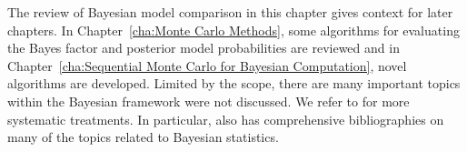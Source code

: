 The review of Bayesian model comparison in this chapter gives context for
later chapters. In Chapter~\ref{cha:Monte Carlo Methods}, some algorithms for
evaluating the Bayes factor and posterior model probabilities are reviewed
and in Chapter~\ref{cha:Sequential Monte Carlo for Bayesian Computation},
novel algorithms are developed. Limited by the scope, there are many
important topics within the Bayesian framework were not discussed. We refer
to \cite{Bernardo:1994vd,Robert:2007tc} for more systematic treatments. In
particular, \cite{Bernardo:1994vd} also has comprehensive bibliographies on
many of the topics related to Bayesian statistics.
